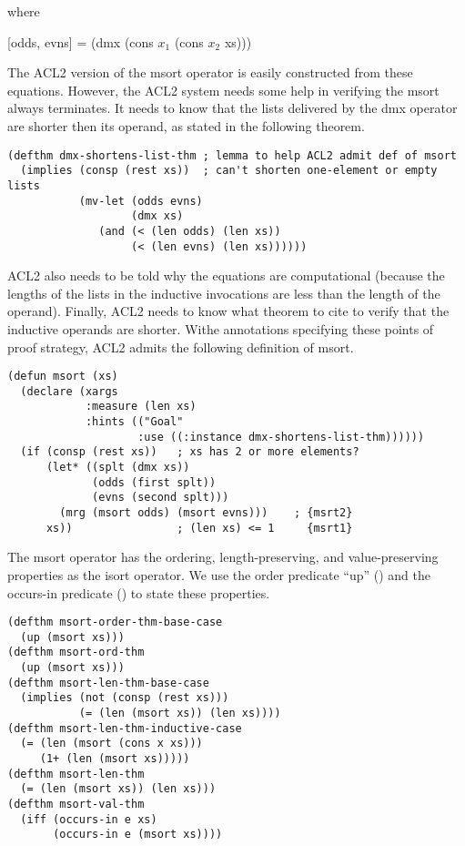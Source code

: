 \hspace{1.2cm} where

\hspace{1.2cm} [odds, evns] = (dmx (cons $x_1$ (cons $x_2$ xs)))

The ACL2 version of the msort operator is easily
constructed from these equations.
However, the ACL2 system needs some help in verifying
the msort always terminates. It needs to know
that the lists delivered by the dmx operator are shorter
then its operand, as stated in the following theorem.

\label{defthm:dmx-shortens-list}
\begin{Verbatim}
(defthm dmx-shortens-list-thm ; lemma to help ACL2 admit def of msort
  (implies (consp (rest xs))  ; can't shorten one-element or empty lists
           (mv-let (odds evns)
                   (dmx xs)
              (and (< (len odds) (len xs))
                   (< (len evns) (len xs))))))
\end{Verbatim}

ACL2 also needs to be told why the equations are computational
(because the lengths of the lists in the inductive invocations
are less than the length of the operand).
Finally, ACL2 needs to know what theorem to cite to verify
that the inductive operands are shorter. 
Withe annotations specifying these points of proof strategy,
ACL2 admits the following definition of msort.

\label{defun:msort}
\begin{Verbatim}
(defun msort (xs)
  (declare (xargs
            :measure (len xs)
            :hints (("Goal"
                    :use ((:instance dmx-shortens-list-thm))))))
  (if (consp (rest xs))   ; xs has 2 or more elements?
      (let* ((splt (dmx xs))
             (odds (first splt))
             (evns (second splt)))
        (mrg (msort odds) (msort evns)))    ; {msrt2}
      xs))                ; (len xs) <= 1     {msrt1} 
\end{Verbatim}

The msort operator has the ordering, length-preserving,
and value-preserving properties as the isort operator.
We use the order predicate ``up'' (\pageref{defun:up})
and the occurs-in predicate (\pageref{def:occurs-in})
to state these properties.

\label{defthm:msort-ord}
\label{defthm:msort-len}
\label{defthm:msort-val}
\begin{Verbatim}
(defthm msort-order-thm-base-case
  (up (msort xs)))
(defthm msort-ord-thm
  (up (msort xs)))
(defthm msort-len-thm-base-case
  (implies (not (consp (rest xs)))
           (= (len (msort xs)) (len xs))))
(defthm msort-len-thm-inductive-case
  (= (len (msort (cons x xs)))
     (1+ (len (msort xs)))))
(defthm msort-len-thm
  (= (len (msort xs)) (len xs)))
(defthm msort-val-thm
  (iff (occurs-in e xs)
       (occurs-in e (msort xs))))
\end{Verbatim}

